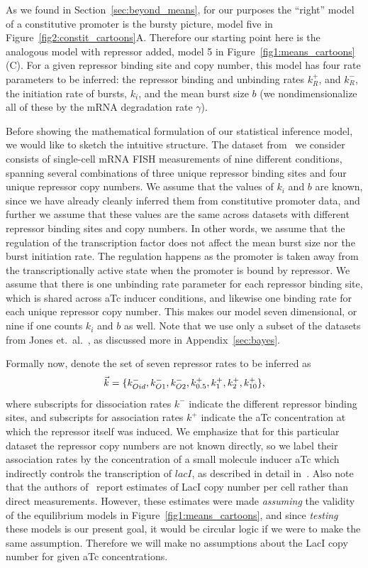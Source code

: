 As we found in Section~\ref{sec:beyond_means}, for our purposes the ``right''
model of a constitutive promoter is the bursty picture, model five in
Figure~\ref{fig2:constit_cartoons}A. Therefore our starting point here is the
analogous model with repressor added, model 5 in
Figure~\ref{fig1:means_cartoons}(C). For a given repressor binding site and copy
number, this model has four rate parameters to be inferred: the repressor
binding and unbinding rates $k_R^+$, and $k_R^-$, the initiation rate of bursts,
$k_i$, and the mean burst size $b$ (we nondimensionalize all of these by the
mRNA degradation rate $\gamma$).

Before showing the mathematical formulation of our statistical inference model,
we would like to sketch the intuitive structure. The dataset
from~\cite{Jones2014} we consider consists of single-cell mRNA FISH measurements
of nine different conditions, spanning several combinations of three unique
repressor binding sites and four unique repressor copy numbers. We assume that
the values of $k_i$ and $b$ are known, since we have already cleanly inferred
them from constitutive promoter data, and further we assume that these values
are the same across datasets with different repressor binding sites and copy
numbers. In other words, we assume that the regulation of the transcription
factor does not affect the mean burst size nor the burst initiation rate. The
regulation happens as the promoter is taken away from the transcriptionally
active state when the promoter is bound by repressor. We assume that there is one unbinding
rate parameter for each repressor binding site, which is shared across aTc
inducer conditions, and likewise one binding rate for each unique repressor copy
number. This makes our model seven dimensional, or nine if one counts $k_i$ and
$b$ as well. Note that we use only a subset of the datasets from
Jones et.\ al.~\cite{Jones2014}, as discussed more in Appendix~\ref{sec:bayes}.

Formally now, denote the set of seven repressor rates to be inferred as
\begin{equation}
\vec{k} =\{k_{Oid}^-, k_{O1}^-, k_{O2}^-,
k_{0.5}^+, k_{1}^+, k_{2}^+, k_{10}^+\},
\end{equation}
where subscripts for dissociation rates $k^-$  indicate the different repressor
binding sites, and subscripts for association rates $k^+$ indicate the aTc
concentration at which the repressor itself was induced. We emphasize that for
this particular dataset the repressor copy numbers are not known directly, so we
label their association rates by the concentration of a small molecule inducer
aTc which indirectly controls the transcription of $\textit{lacI}$, as
described in detail in~\cite{Jones2014}. Also note
that the authors of~\cite{Jones2014} report estimates of LacI copy number per
cell rather than direct measurements. However, these estimates were made
\textit{assuming} the validity of the equilibrium models in
Figure~\ref{fig1:means_cartoons}, and since \textit{testing} these models is our
present goal, it would be circular logic if we were to make the same assumption.
Therefore we will make no assumptions about the LacI copy number for given aTc
concentrations.

